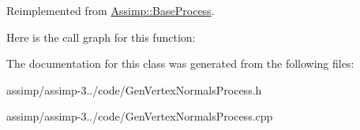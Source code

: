 Reimplemented from \hyperlink{class_assimp_1_1_base_process_aae14d0a8c5918642d4a272b7b74b5d70}{Assimp\+::\+Base\+Process}.



Here is the call graph for this function\+:




The documentation for this class was generated from the following files\+:\begin{DoxyCompactItemize}
\item 
assimp/assimp-\/3../code/Gen\+Vertex\+Normals\+Process.\+h\item 
assimp/assimp-\/3../code/Gen\+Vertex\+Normals\+Process.\+cpp\end{DoxyCompactItemize}
